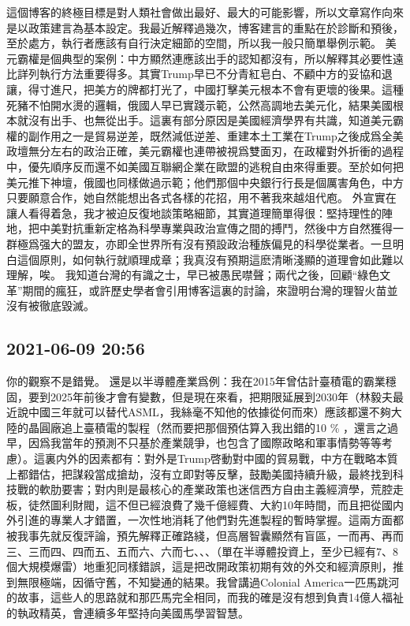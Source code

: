 \documentclass[twocolumn]{ctexart}
\begin{document}
這個博客的終極目標是對人類社會做出最好、最大的可能影響，所以文章寫作向來是以政策建言為基本設定。我最近解釋過幾次，博客建言的重點在於診斷和預後，至於處方，執行者應該有自行決定細節的空間，所以我一般只簡單舉例示範。
美元霸權是個典型的案例：中方顯然連應該出手的認知都沒有，所以解釋其必要性遠比詳列執行方法重要得多。其實Trump早已不分青紅皂白、不顧中方的妥協和退讓，得寸進尺，把美方的牌都打光了，中國打擊美元根本不會有更壞的後果。這種死豬不怕開水燙的邏輯，俄國人早已實踐示範，公然高調地去美元化，結果美國根本就沒有出手、也無從出手。這裏有部分原因是美國經濟學界有共識，知道美元霸權的副作用之一是貿易逆差，既然減低逆差、重建本土工業在Trump之後成爲全美政壇無分左右的政治正確，美元霸權也連帶被視爲雙面刃，在政權對外折衝的過程中，優先順序反而還不如美國互聯網企業在歐盟的逃稅自由來得重要。至於如何把美元推下神壇，俄國也同樣做過示範；他們那個中央銀行行長是個厲害角色，中方只要願意合作，她自然能想出各式各樣的花招，用不著我來越俎代庖。
外宣實在讓人看得着急，我才被迫反復地談策略細節，其實道理簡單得很：堅持理性的陣地，把中美對抗重新定格為科學專業與政治宣傳之間的搏鬥，然後中方自然獲得一群極爲强大的盟友，亦即全世界所有沒有預設政治種族偏見的科學從業者。一旦明白這個原則，如何執行就順理成章；我真沒有預期這麽清晰淺顯的道理會如此難以理解，唉。
我知道台灣的有識之士，早已被愚民噤聲；兩代之後，回顧“綠色文革”期間的瘋狂，或許歷史學者會引用博客這裏的討論，來證明台灣的理智火苗並沒有被徹底毀滅。
\subsection*{2021-06-09 20:56}

你的觀察不是錯覺。
還是以半導體產業爲例：我在2015年曾估計臺積電的霸業穩固，要到2025年前後才會有變數，但是現在來看，把期限延展到2030年（林毅夫最近說中國三年就可以替代ASML，我絲毫不知他的依據從何而來）應該都還不夠大陸的晶圓廠追上臺積電的製程（然而要把那個預估算入我出錯的10 \% ，還言之過早，因爲我當年的預測不只基於產業競爭，也包含了國際政略和軍事情勢等等考慮）。這裏内外的因素都有：對外是Trump啓動對中國的貿易戰，中方在戰略本質上都錯估，把謀殺當成搶劫，沒有立即對等反擊，鼓勵美國持續升級，最終找到科技戰的軟肋要害；對内則是最核心的產業政策也迷信西方自由主義經濟學，荒腔走板，徒然圖利財閥，這不但已經浪費了幾千億經費、大約10年時間，而且把從國内外引進的專業人才錯置，一次性地消耗了他們對先進製程的暫時掌握。這兩方面都被我事先就反復評論，預先解釋正確路綫，但高層智囊顯然有盲區，一而再、再而三、三而四、四而五、五而六、六而七、、、（單在半導體投資上，至少已經有7、8個大規模爆雷）地重犯同樣錯誤，這是把改開政策初期有效的外交和經濟原則，推到無限極端，因循守舊，不知變通的結果。我曾講過Colonial America一匹馬跳河的故事，這些人的思路就和那匹馬完全相同，而我的確是沒有想到負責14億人福祉的執政精英，會連續多年堅持向美國馬學習智慧。
\end{document}
